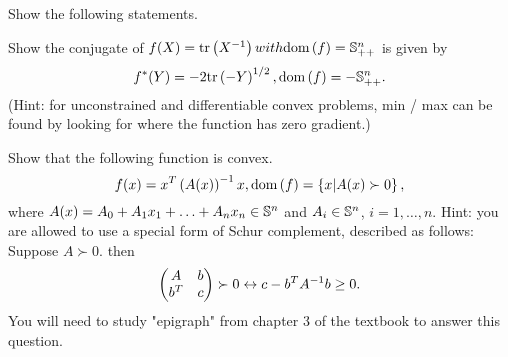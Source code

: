 \documentclass{exam}
\begin{document}
\begin{questions}
    \newpage
    \question Show the following statements.



    \newpage
    \question Show the conjugate of $f(X) = \tr{X^\inv} with \dom{f} = \S_{++}^n$ is given by
    $$f^*(Y) = -2\tr{-Y}^{1 / 2}, \dom{f} = -\S_{++}^n.$$
    (Hint: for unconstrained and differentiable convex problems, min / max can be found by looking for where the function
    has zero gradient.)

    \question Show that the following function is convex.
    $$f(x) = x^T\paren{A(x)}^\inv x, \dom{f} = \cbrac{x | A(x) \succ 0},$$
    where $A(x) = A_0 + A_1x_1 + \hdots + A_nx_n \in\S^n$ and $A_i\in\S^n$, $i = 1, \hdots, n$. Hint: you are allowed to use
    a special form of Schur complement, described as follows: Suppose $A \succ 0$. then
    $$\paren{\begin{matrix}
        A & b \\
        b^T & c
    \end{matrix}} \succ 0 \leftrightarrow c - b^TA^\inv b \geq 0.$$
    You will need to study "epigraph" from chapter 3 of the textbook to answer this question.


\end{questions}
\end{document}
